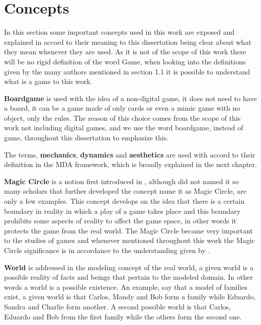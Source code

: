 \section{Concepts}
In this section some important concepts used in this work are exposed and explained in accord to their meaning to this dissertation being clear about what they mean whenever they are used. As it is not of the scope of this work there will be no rigid definition of the word Game, when looking into the definitions given by the many authors mentioned in section 1.1 it is possible to understand what is a game to this work. 

\textbf{Boardgame} is used with the idea of a non-digital game, it does not need to have a board, it can be a game made of only cards or even a mimic game with no object, only the rules. The reason of this choice comes from the scope of this work not including digital games, and we use the word boardgame, instead of game, throughout this dissertation to emphasize this.

The terms, \textbf{mechanics}, \textbf{dynamics} and \textbf{aesthetics} are used with accord to their definition in the MDA framework, which is broadly explained in the next chapter. 

\textbf{Magic Circle} is a notion first introduced in \cite{huizinga2014homo}, although \citeauthor{huizinga2014homo} did not named it so many scholars that further developed the concept name it as Magic Circle, \cite{salen2004rules,bateman_implicit_2015} are only a few examples. This concept develops on the idea that there is a certain boundary in reality in which a play of a game takes place and this boundary prohibits some aspects of reality to affect the game space, in other words it protects the game from the real world. The Magic Circle became very important to the studies of games and whenever mentioned throughout this work the Magic Circle significance is in accordance to the understanding given by \cite{salen2004rules}.

\textbf{World} is addressed in the modeling concept of the real world, a given world is a possible reality of facts and beings that pertain to the modeled domain. In other words a world is a possible existence. An example, say that a model of families exist, a given world is that Carlos, Mandy and Bob form a family while Eduardo, Sandra and Charlie form another. A second possible world is that Carlos, Eduardo and Bob from the first family while the others form the second one. 

